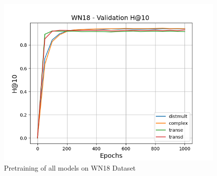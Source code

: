 \begin{figure}
\begin{minipage}{.3\textwidth}
      \centering
      \includegraphics[width=0.9\linewidth]{figures/results/pretrain/wn18/pretrain_wn18_hit10s.png}
    \end{minipage}%
    \caption{Pretraining of all models on \textsc{WN18} Dataset}
    \label{fig:test}
\end{figure}

\pagebreak

